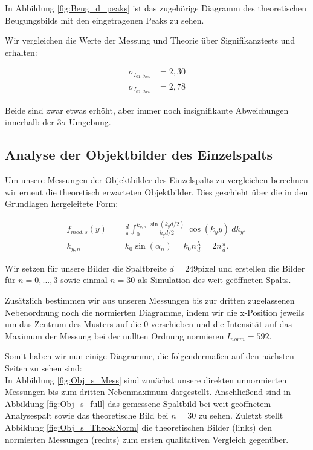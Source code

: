 \documentclass{article}
\begin{document}
In Abbildung \ref{fig:Beug_d_peaks} ist das zugehörige Diagramm des theoretischen Beugungsbilds mit den eingetragenen Peaks zu sehen. 

Wir vergleichen die Werte der Messung und Theorie über Signifikanztests und erhalten:

\begin{equation}
    \begin{split}
        \sigma_{I_{01,theo}} &= 2,30 \\
        \sigma_{I_{02,theo}} &= 2,78
    \end{split}
\end{equation}

Beide sind zwar etwas erhöht, aber immer noch insignifikante Abweichungen innerhalb der $3\sigma$-Umgebung. 


\clearpage
\newpage
\subsection{Analyse der Objektbilder des Einzelspalts}

Um unsere Messungen der Objektbilder des Einzelspalts zu vergleichen berechnen wir erneut die theoretisch erwarteten Objektbilder. Dies geschieht über die in den Grundlagen hergeleitete Form:

\begin{equation}
    \begin{split}
        f_{mod,s} (y) &= \frac{d}{\pi} \int_0^{k_{y,n}} \frac{\sin{(k_y d / 2)}}{k_y d / 2} \ \cos{(k_y y)} \ dk_y, \\
        k_{y,n} &= k_0 \sin{(\alpha_n)} = k_0 n \frac{\lambda}{d} = 2 n \frac{\pi}{d}.
    \end{split}
\end{equation}

Wir setzen für unsere Bilder die Spaltbreite $d=249$pixel und erstellen die Bilder für $n=0,...,3$ sowie einmal $n=30$ als Simulation des weit geöffneten Spalts. 

Zusätzlich bestimmen wir aus unseren Messungen bis zur dritten zugelassenen Nebenordnung noch die normierten Diagramme, indem wir die x-Position jeweils um das Zentrum des Musters auf die 0 verschieben und die Intensität auf das Maximum der Messung bei der nullten Ordnung normieren $I_{norm} = 592$.

Somit haben wir nun einige Diagramme, die folgendermaßen auf den nächsten Seiten zu sehen sind: \\ In Abbildung \ref{fig:Obj_s_Mess} sind zunächst unsere direkten unnormierten Messungen bis zum dritten Nebenmaximum dargestellt. Anschließend sind in Abbildung \ref{fig:Obj_s_full} das gemessene Spaltbild bei weit geöffnetem Analysespalt sowie das theoretische Bild bei $n=30$ zu sehen. Zuletzt stellt Abbildung \ref{fig:Obj_s_Theo&Norm} die theoretischen Bilder (links) den normierten Messungen (rechts) zum ersten qualitativen Vergleich gegenüber.  
\end{document}
